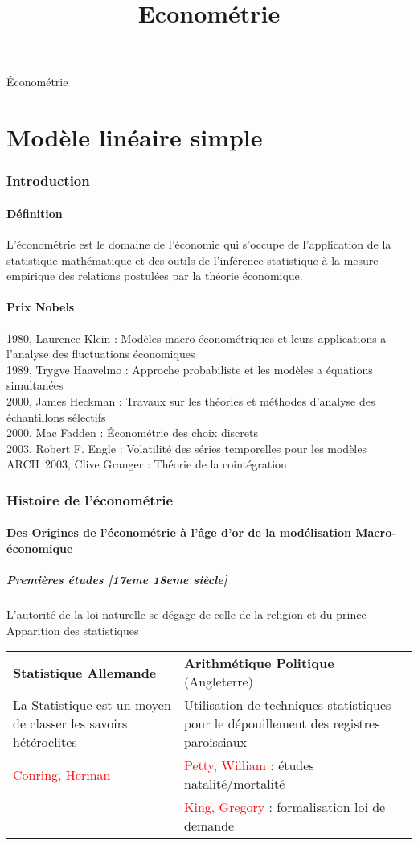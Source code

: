 \documentclass{article}
\title{Econométrie}
\begin{document}
{\Huge Économétrie}
\tableofcontents
\newpage
\part{Modèle linéaire simple}
\section{Introduction}
\subsection{Définition}
L'économétrie est le domaine de l'économie qui s'occupe de l'application de la statistique mathématique et 
des outils de l'inférence statistique à la mesure empirique des relations postulées par la théorie économique.
\subsection{Prix Nobels}
1980, Laurence Klein : Modèles macro-économétriques et leurs applications a l'analyse des fluctuations économiques\\
1989, Trygve Haavelmo : Approche probabiliste et les modèles a équations simultanées\\
2000, James Heckman : Travaux sur les théories et méthodes d'analyse des échantillons sélectifs\\
2000, Mac Fadden : Économétrie des choix discrets\\
2003, Robert F. Engle : Volatilité des séries temporelles pour les modèles ARCH\
2003, Clive Granger : Théorie de la cointégration
\section{Histoire de l'économétrie}
\subsection{Des Origines de l'économétrie à l'âge d'or de la modélisation Macro-économique}
\subsubsection{Premières études [17eme 18eme siècle]}
L'autorité de la loi naturelle se dégage de celle de la religion et du prince\\
Apparition des statistiques
\begin{center}
\begin{tabular}{m{200pt}|m{200pt}}
\textbf{Statistique Allemande} & \textbf{Arithmétique Politique} (Angleterre)\\
La Statistique est un moyen de classer les savoirs hétéroclites & Utilisation de techniques statistiques pour le dépouillement des registres paroissiaux \\
\textcolor{red}{Conring, Herman} & \textcolor{red}{Petty, William } : études natalité/mortalité\\
& \textcolor{red}{King, Gregory} : formalisation loi de demande
\end{tabular}
\end{center}
\end{document}
